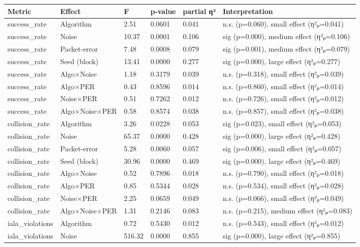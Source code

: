 \begin{tabular}{llllll}
\toprule
Metric & Effect & F & p-value & partial η² & Interpretation \\
\midrule
success\_rate & Algorithm & 2.51 & 0.0601 & 0.041 & n.s. (p=0.060), small effect (η²ₚ=0.041) \\
success\_rate & Noise & 10.37 & 0.0001 & 0.106 & sig (p=0.000), medium effect (η²ₚ=0.106) \\
success\_rate & Packet-error & 7.48 & 0.0008 & 0.079 & sig (p=0.001), medium effect (η²ₚ=0.079) \\
success\_rate & Seed (block) & 13.41 & 0.0000 & 0.277 & sig (p=0.000), large effect (η²ₚ=0.277) \\
success\_rate & Algo×Noise & 1.18 & 0.3179 & 0.039 & n.s. (p=0.318), small effect (η²ₚ=0.039) \\
success\_rate & Algo×PER & 0.43 & 0.8596 & 0.014 & n.s. (p=0.860), small effect (η²ₚ=0.014) \\
success\_rate & Noise×PER & 0.51 & 0.7262 & 0.012 & n.s. (p=0.726), small effect (η²ₚ=0.012) \\
success\_rate & Algo×Noise×PER & 0.58 & 0.8574 & 0.038 & n.s. (p=0.857), small effect (η²ₚ=0.038) \\
collision\_rate & Algorithm & 3.26 & 0.0228 & 0.053 & sig (p=0.023), small effect (η²ₚ=0.053) \\
collision\_rate & Noise & 65.37 & 0.0000 & 0.428 & sig (p=0.000), large effect (η²ₚ=0.428) \\
collision\_rate & Packet-error & 5.28 & 0.0060 & 0.057 & sig (p=0.006), small effect (η²ₚ=0.057) \\
collision\_rate & Seed (block) & 30.96 & 0.0000 & 0.469 & sig (p=0.000), large effect (η²ₚ=0.469) \\
collision\_rate & Algo×Noise & 0.52 & 0.7896 & 0.018 & n.s. (p=0.790), small effect (η²ₚ=0.018) \\
collision\_rate & Algo×PER & 0.85 & 0.5344 & 0.028 & n.s. (p=0.534), small effect (η²ₚ=0.028) \\
collision\_rate & Noise×PER & 2.25 & 0.0659 & 0.049 & n.s. (p=0.066), small effect (η²ₚ=0.049) \\
collision\_rate & Algo×Noise×PER & 1.31 & 0.2146 & 0.083 & n.s. (p=0.215), medium effect (η²ₚ=0.083) \\
iala\_violations & Algorithm & 0.72 & 0.5430 & 0.012 & n.s. (p=0.543), small effect (η²ₚ=0.012) \\
iala\_violations & Noise & 516.32 & 0.0000 & 0.855 & sig (p=0.000), large effect (η²ₚ=0.855) \\

\end{tabular}
